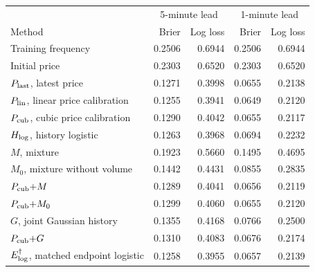 \begin{tabular}{lrrrr}
\toprule
 & \multicolumn{2}{c}{5-minute lead} & \multicolumn{2}{c}{1-minute lead} \\
Method & Brier & Log loss & Brier & Log loss \\
\midrule
Training frequency & 0.2506 & 0.6944 & 0.2506 & 0.6944 \\
Initial price & 0.2303 & 0.6520 & 0.2303 & 0.6520 \\
$P_{\rm last}$, latest price & 0.1271 & 0.3998 & 0.0655 & 0.2138 \\
$P_{\rm lin}$, linear price calibration & 0.1255 & 0.3941 & 0.0649 & 0.2120 \\
$P_{\rm cub}$, cubic price calibration & 0.1290 & 0.4042 & 0.0655 & 0.2117 \\
$H_{\rm log}$, history logistic & 0.1263 & 0.3968 & 0.0694 & 0.2232 \\
$M$, mixture & 0.1923 & 0.5660 & 0.1495 & 0.4695 \\
$M_0$, mixture without volume & 0.1442 & 0.4431 & 0.0855 & 0.2835 \\
$P_{\rm cub}{+}M$ & 0.1289 & 0.4041 & 0.0656 & 0.2119 \\
$P_{\rm cub}{+}M_0$ & 0.1299 & 0.4060 & 0.0655 & 0.2120 \\
$G$, joint Gaussian history & 0.1355 & 0.4168 & 0.0766 & 0.2500 \\
$P_{\rm cub}{+}G$ & 0.1310 & 0.4083 & 0.0676 & 0.2174 \\
$E_{\rm log}^\dagger$, matched endpoint logistic & 0.1258 & 0.3955 & 0.0657 & 0.2139 \\
\bottomrule
\end{tabular}
